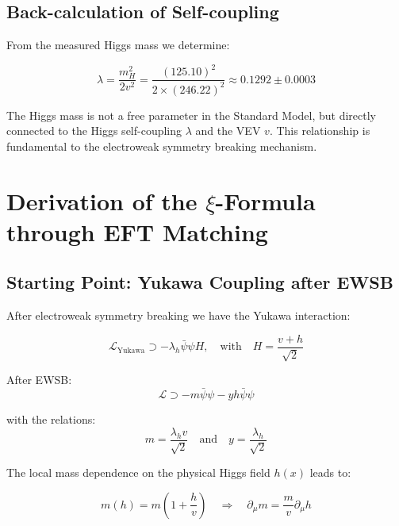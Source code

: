 \documentclass[12pt,a4paper]{article}
\theoremstyle{definition}
\begin{document}
	\subsection{Back-calculation of Self-coupling}
	
	From the measured Higgs mass we determine:
	
	\begin{equation}
		\lambda = \frac{m_H^2}{2v^2} = \frac{(125.10)^2}{2 \times (246.22)^2} \approx 0.1292 \pm 0.0003
	\end{equation}
	
	\begin{important}
		The Higgs mass is not a free parameter in the Standard Model, but directly connected to the Higgs self-coupling $\lambda$ and the VEV $v$. This relationship is fundamental to the electroweak symmetry breaking mechanism.
	\end{important}
	
	\section{Derivation of the $\xi$-Formula through EFT Matching}
	
	\subsection{Starting Point: Yukawa Coupling after EWSB}
	
	After electroweak symmetry breaking we have the Yukawa interaction:
	
	\begin{equation}
		\mathcal{L}_{\text{Yukawa}} \supset -\lambda_h \bar{\psi}\psi H, \quad \text{with} \quad H = \frac{v + h}{\sqrt{2}}
	\end{equation}
	
	After EWSB:
	\begin{equation}
		\mathcal{L} \supset -m \bar{\psi}\psi - y h \bar{\psi}\psi
	\end{equation}
	
	with the relations:
	\begin{equation}
		m = \frac{\lambda_h v}{\sqrt{2}} \quad \text{and} \quad y = \frac{\lambda_h}{\sqrt{2}}
	\end{equation}
	
	The local mass dependence on the physical Higgs field $h(x)$ leads to:
	
	\begin{equation}
		m(h) = m\left(1 + \frac{h}{v}\right) \quad \Rightarrow \quad \partial_\mu m = \frac{m}{v}\partial_\mu h
	\end{equation}
	
\end{document}
